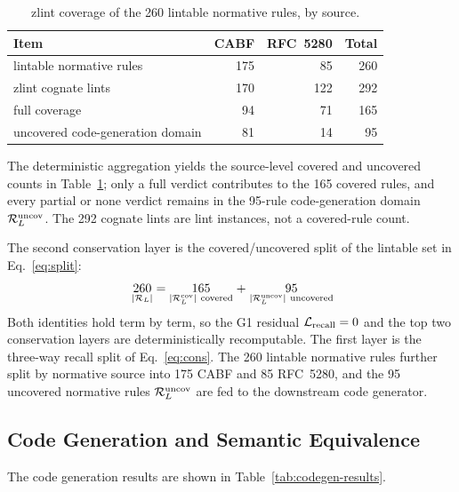 \begin{table}[tb]
\centering
\small
\setlength{\tabcolsep}{3pt}
\caption{zlint coverage of the 260 lintable normative rules, by source.}
\label{tab:coverage}
\begin{tabularx}{\columnwidth}{@{}X r r r@{}}
\toprule
Item & CABF & RFC~5280 & Total \\
\midrule
lintable normative rules & 175 & 85 & 260 \\
zlint cognate lints & 170 & 122 & 292 \\
full coverage & 94 & 71 & 165 \\
uncovered code-generation domain & 81 & 14 & 95 \\
\bottomrule
\end{tabularx}
\end{table}

The deterministic aggregation yields the source-level covered and uncovered
counts in Table~\ref{tab:coverage}; only a full verdict contributes to the 165
covered rules, and every partial or none verdict remains in the 95-rule
code-generation domain $\mathcal{R}_L^{\mathrm{uncov}}$. The 292 cognate lints are lint instances, not
a covered-rule count.

The second conservation layer is the covered/uncovered split of the lintable
set in Eq.~\eqref{eq:split}:
\[
\begin{array}{c @{\;} c @{\;} c @{\;} c @{\;} c @{\;} c @{\;} c}
  \underset{|\RL|}{260} & = & \underset{|\RLcov|\ \text{covered}}{165} & + & \underset{|\RLunc|\ \text{uncovered}}{95}
\end{array}
\]
Both identities hold term by term, so the G1 residual $\mathcal{L}_{\mathrm{recall}} = 0$ and the top
two conservation layers are deterministically recomputable. The
first layer is the three-way recall split of Eq.~\eqref{eq:cons}.
The 260 lintable normative rules further split by normative source into 175 CABF
and 85 RFC~5280, and the 95 uncovered normative rules $\mathcal{R}_L^{\mathrm{uncov}}$ are fed to the
downstream code generator.

\subsection{Code Generation and Semantic Equivalence}
\label{subsec:codegen-results}

The code generation results are shown in Table~\ref{tab:codegen-results}.


